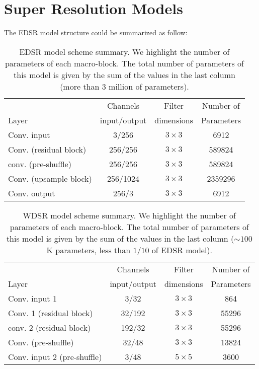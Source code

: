 \documentclass{standalone}
\begin{document}
\section[Super Resolution Models]{Super Resolution Models}\label{SR:wdsr}


The EDSR model structure could be summarized as follow:





\begin{table}[htbp]
\centering
\begin{tabular}{lccc}
\hline \rowcolor{darkgrayrow}
                         &  Channels     & Filter     & Number of    \\
\rowcolor{darkgrayrow}
Layer                    & input/output  & dimensions & Parameters   \\
\hline
Conv. input              & 3/256      & $3\times3$   & 6912    \\
Conv. (residual block)   & 256/256    & $3\times3$   & 589824  \\
conv. (pre-shuffle)      & 256/256    & $3\times3$   & 589824  \\
Conv. (upsample block)   & 256/1024   & $3\times3$   & 2359296 \\
Conv. output             & 256/3      & $3\times3$   & 6912    \\
\hline
\end{tabular}
\caption{EDSR model scheme summary.
We highlight the number of parameters of each macro-block.
The total number of parameters of this model is given by the sum of the values in the last column (more than 3 million of parameters).
}
\label{tab:edsr}
\end{table}





\begin{table}[htbp]
\centering
\begin{tabular}{lccc}
\hline \rowcolor{darkgrayrow}
                            &  Channels     & Filter     & Number of    \\
\rowcolor{darkgrayrow}
Layer                       & input/output  & dimensions & Parameters   \\
\hline
Conv. input 1               & 3/32       & $3\times3$   & 864     \\
Conv. 1 (residual block)    & 32/192     & $3\times3$   & 55296   \\
conv. 2 (residual block)    & 192/32     & $3\times3$   & 55296   \\
Conv. (pre-shuffle)         & 32/48      & $3\times3$   & 13824   \\
Conv. input 2 (pre-shuffle) & 3/48       & $5\times5$   & 3600    \\
\hline
\end{tabular}
\caption{WDSR model scheme summary.
We highlight the number of parameters of each macro-block.
The total number of parameters of this model is given by the sum of the values in the last column ($\sim100$K parameters, less than $1/10$ of EDSR model).
}
\label{tab:wdsr}
\end{table}
\end{document}

